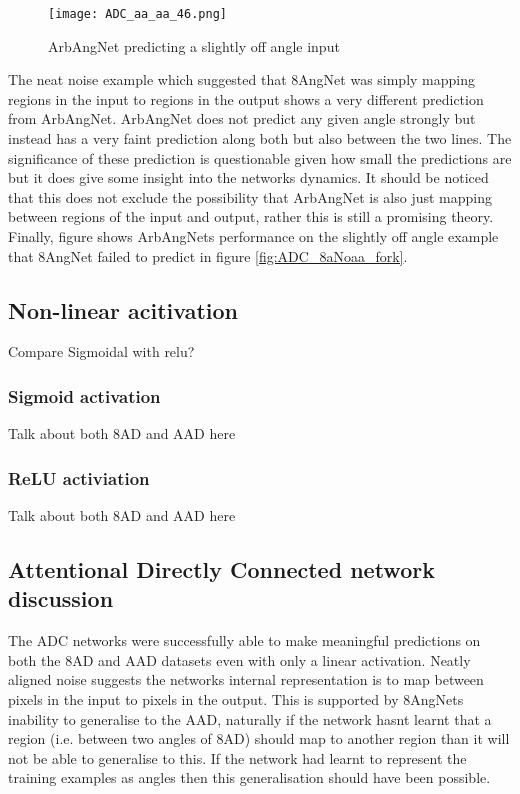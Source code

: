 \begin{figure}[h]
    \centering
    \texttt{[image: ADC\_aa\_aa\_46.png]}
    \caption{ArbAngNet predicting a slightly off angle input}
    \label{fig:ADC_aaaa_fork}
\end{figure}


The neat noise example which suggested that 8AngNet was simply mapping regions in the input to regions in the output shows a very different prediction from ArbAngNet.
ArbAngNet does not predict any given angle strongly but instead has a very faint prediction along both but also between the two lines. 
The significance of these prediction is questionable given how small the predictions are but it does give some insight into the networks dynamics.
It should be noticed that this does not exclude the possibility that ArbAngNet is also just mapping between regions of the input and output, rather this is still a promising theory.
Finally, figure \cite{fig:ADC_aaaa_fork} shows ArbAngNets performance on the slightly off angle example that 8AngNet failed to predict in figure \ref{fig:ADC_8aNoaa_fork}.

\subsection{Non-linear acitivation}
Compare Sigmoidal with relu?

\subsubsection{Sigmoid activation}
Talk about both 8AD and AAD here

\subsubsection{ReLU activiation}
Talk about both 8AD and AAD here 

\subsection{Attentional Directly Connected network discussion}
The ADC networks were successfully able to make meaningful predictions on both the 8AD and AAD datasets even with only a linear activation.
Neatly aligned noise suggests the networks internal representation is to map between pixels in the input to pixels in the output.
This is supported by 8AngNets inability to generalise to the AAD, naturally if the network hasnt learnt that a region (i.e. between two angles of 8AD) should map to another region than it will not be able to generalise to this. 
If the network had learnt to represent the training examples as angles then this generalisation should have been possible. 


